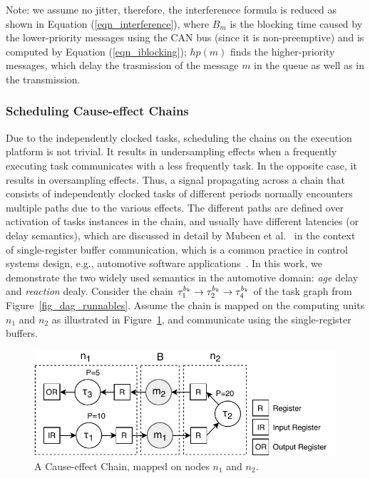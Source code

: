 {{Note: we assume no jitter, therefore, the interferenece formula is reduced as shown in Equation (\ref{eqn_interference}), where $B_m$ is the blocking time caused by the lower-priority messages using the CAN bus (since it is non-preemptive) and is computed by Equation (\ref{eqn_iblocking}); $hp(m)$ finds the higher-priority messages, which delay the trasmission of the message $m$ in the queue as well as in the transmission.

\subsubsection{Scheduling Cause-effect Chains}\label{subsec_cause-effect_chains}
Due to the independently clocked tasks, scheduling the chains on the execution platform is not trivial. It results in undersampling effects when a frequently executing task communicates with a less frequently task. In the opposite case, it results in oversampling effects. Thus, a signal propagating across a chain that consists of independently clocked tasks of different periods normally encounters multiple paths due to the various effects. The different paths are defined over activation of tasks instances in the chain, and usually have different latencies (or delay semantics), which are discussed in detail by Mubeen et al.~\cite{mubeen2013support} in the context of single-register buffer communication,  which is a common practice in control systems design, e.g., automotive software applications~\cite{Becker2017End-to-endSystems}. In this work, we demonstrate the two widely used semantics in the automotive domain: \textit{age} delay and \textit{reaction} dealy. Consider the chain $\sss{\tau}[k][1][b]\rightarrow \sss{\tau}[k][2][b]\rightarrow \sss{\tau}[k][4][b]$ of the task graph \ttat[1] from Figure~\ref{fig_dag_runnables}. Assume the chain is mapped on the computing units $n_1$ and $n_2$ as illustrated in Figure~\ref{fig_cause_effect_chain}, and communicate using the single-register buffers.
\begin{figure}
	\centering
	\includegraphics[width=0.7\linewidth]{img/cause_effect_chain_ntk}
	\caption{A Cause-effect Chain, mapped on nodes $n_1$ and $n_2$.}
	\label{fig_cause_effect_chain}
\end{figure}

}}
